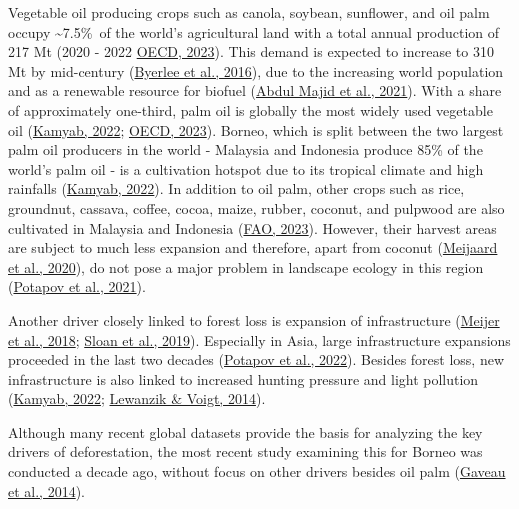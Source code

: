 \documentclass[
  letterpaper,
  DIV=11,
  numbers=noendperiod]{scrreprt}
\begin{document}
Vegetable oil producing crops such as canola, soybean, sunflower, and
oil palm occupy \textasciitilde7.5\%~of the world's agricultural land
with a total annual production of 217 Mt (2020 - 2022
\protect\hyperlink{ref-oecdOECDFAOAgriculturalOutlook2023}{OECD, 2023}).
This demand is expected to increase to 310 Mt by mid-century
(\protect\hyperlink{ref-byerleeTropicalOilCrop2016}{Byerlee et al.,
2016}), due to the increasing world population and as a renewable
resource for biofuel
(\protect\hyperlink{ref-abdulmajidSustainablePalmOil2021}{Abdul Majid et
al., 2021}). With a share of approximately one-third, palm oil is
globally the most widely used vegetable oil
(\protect\hyperlink{ref-kamyabElaeisGuineensis2022}{Kamyab, 2022};
\protect\hyperlink{ref-oecdOECDFAOAgriculturalOutlook2023}{OECD, 2023}).
Borneo, which is split between the two largest palm oil producers in the
world - Malaysia and Indonesia produce 85\% of the world's palm oil - is
a cultivation hotspot due to its tropical climate and high rainfalls
(\protect\hyperlink{ref-kamyabElaeisGuineensis2022}{Kamyab, 2022}). In
addition to oil palm, other crops such as rice, groundnut, cassava,
coffee, cocoa, maize, rubber, coconut, and pulpwood are also cultivated
in Malaysia and Indonesia
(\protect\hyperlink{ref-faoFAOSTATDatabase2023}{FAO, 2023}). However,
their harvest areas are subject to much less expansion and therefore,
apart from coconut
(\protect\hyperlink{ref-meijaardCoconutOilConservation2020}{Meijaard et
al., 2020}), do not pose a major problem in landscape ecology in this
region (\protect\hyperlink{ref-potapovGlobalMapsCropland2021}{Potapov et
al., 2021}).

Another driver closely linked to forest loss is expansion of
infrastructure
(\protect\hyperlink{ref-meijerGlobalPatternsCurrent2018}{Meijer et al.,
2018};
\protect\hyperlink{ref-sloanHiddenChallengesConservation2019}{Sloan et
al., 2019}). Especially in Asia, large infrastructure expansions
proceeded in the last two decades
(\protect\hyperlink{ref-potapovGlobal20002020Land2022}{Potapov et al.,
2022}). Besides forest loss, new infrastructure is also linked to
increased hunting pressure and light pollution
(\protect\hyperlink{ref-kamyabElaeisGuineensis2022}{Kamyab, 2022};
\protect\hyperlink{ref-lewanzikArtificialLightPuts2014}{Lewanzik \&
Voigt, 2014}).

Although many recent global datasets provide the basis for analyzing the
key drivers of deforestation, the most recent study examining this for
Borneo was conducted a decade ago, without focus on other drivers
besides oil palm
(\protect\hyperlink{ref-gaveauFourDecadesForest2014}{Gaveau et al.,
2014}).
\end{document}

